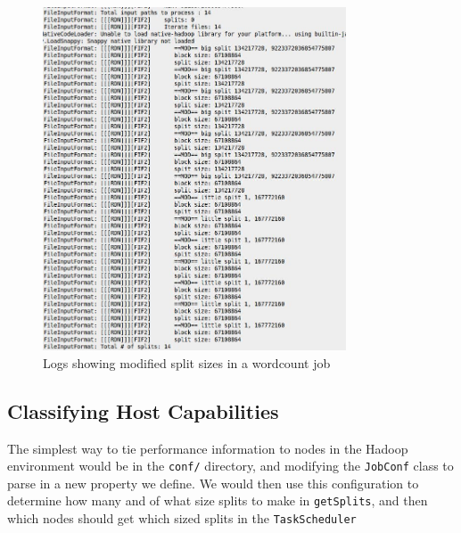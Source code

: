 \begin{figure}[ht!]
\centering
\includegraphics[width=90mm]{getSplitsLog.jpg}
\caption{Logs showing modified split sizes in a wordcount job}
\label{fig:getSplitsLog}
\end{figure}

\subsection{Classifying Host Capabilities}
The simplest way to tie performance information to nodes in the Hadoop
environment would be in the \texttt{conf/} directory, and modifying the
\texttt{JobConf} class to parse in a new property we define. We would then
use this configuration to determine how many and of what size splits to make
in \texttt{getSplits}, and then which nodes should get which sized splits
in the \texttt{TaskScheduler}